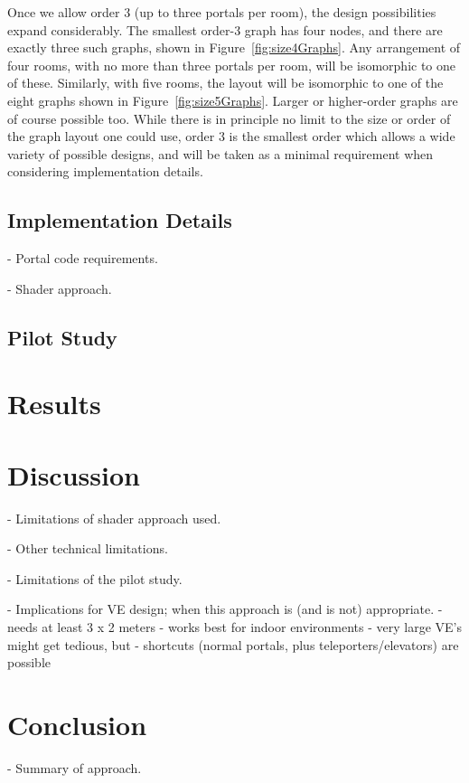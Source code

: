\documentclass{sigchi}
\begin{document}
Once we allow order 3 (up to three portals per room), the design possibilities expand considerably.  The smallest order-3 graph has four nodes, and there are exactly three such graphs, shown in Figure~\ref{fig:size4Graphs}.  Any arrangement of four rooms, with no more than three portals per room, will be isomorphic to one of these.  Similarly, with five rooms, the layout will be isomorphic to one of the eight graphs shown in Figure~\ref{fig:size5Graphs}.  Larger or higher-order graphs are of course possible too.  While there is in principle no limit to the size or order of the graph layout one could use, order 3 is the smallest order which allows a wide variety of possible designs, and will be taken as a minimal requirement when considering implementation details.

\subsection{Implementation Details}

- Portal code requirements.

- Shader approach.

\subsection{Pilot Study}

\section{Results}

\section{Discussion}

- Limitations of shader approach used.

- Other technical limitations.

- Limitations of the pilot study.

- Implications for VE design; when this approach is (and is not) appropriate.
	- needs at least 3 x 2 meters
	- works best for indoor environments
	- very large VE's might get tedious, but
	- shortcuts (normal portals, plus teleporters/elevators) are possible

\section{Conclusion}

- Summary of approach.
\end{document}
